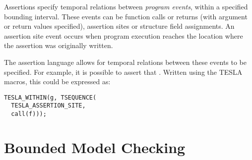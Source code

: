 Assertions specify temporal relations between \emph{program events}, within a
specified bounding interval. These events can be function calls or returns (with
argument or return values specified), assertion sites or structure field
assignments. An assertion site event occurs when program execution reaches the
location where the assertion was originally written.

The assertion language allows for temporal relations between these events to be
specified. For example, it is possible to assert that . Written using the TESLA macros, this could be expressed as:

\begin{verbatim}
TESLA_WITHIN(g, TSEQUENCE(
  TESLA_ASSERTION_SITE,
  call(f)));
\end{verbatim}

\section{Bounded Model Checking}

\iffalse

\begin{figure}[ht]
  \centering
  \begin{tikzpicture}[>=latex',initial text={},
                      node distance=3cm,on grid,auto]
    \node[state,initial,accepting] (only) [] {};
    \node [draw,dashed,fit=(only),inner sep=0.3cm] {};
  \end{tikzpicture}
  \caption{Null Assertion}
  \label{fig:gv}
\end{figure}

\begin{figure}[ht]
  \centering
  \begin{tikzpicture}[>=latex',initial text={},
                      node distance=3cm,on grid,auto]
    \node[state,initial] (start) [] {};
    \node[state,accepting] (end) [right=of start] {};
    \node[draw,dashed,fit=(start) (end), inner sep=0.3cm] {};
    \path[->] (start) edge node {event} (end);
  \end{tikzpicture}
  \caption{Single Event Automaton}
  \label{fig:gv}
\end{figure}

\fi
